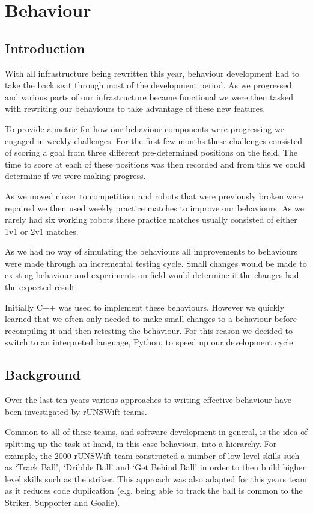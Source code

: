 \documentclass[pdftex,11pt,a4paper]{report}
\begin{document}
\newpage
\chapter{Behaviour}\label{sectionBehaviour}

\section{Introduction}
With all infrastructure being rewritten this year, behaviour development had to take the back seat through most of the development period. As we progressed and various parts of our infrastructure became functional we were then tasked with rewriting our behaviours to take advantage of these new features. 

To provide a metric for how our behaviour components were progressing we engaged in weekly challenges. For the first few months these challenges consisted of scoring a goal from three different pre-determined positions on the field. The time to score at each of these positions was then recorded and from this we could determine if we were making progress. 

As we moved closer to competition, and robots that were previously broken were repaired we then used weekly practice matches to improve our behaviours. As we rarely had six working robots these practice matches usually consisted of either 1v1 or 2v1 matches.

As we had no way of simulating the behaviours all improvements to behaviours were made through an incremental testing cycle. Small changes would be made to existing behaviour and experiments on field would determine if the changes had the expected result.

Initially C++ was used to implement these behaviours. However we quickly learned that we often only needed to make small changes to a behaviour before recompiling it and then retesting the behaviour. For this reason we decided to switch to an interpreted language, Python, to speed up our development cycle.

\section{Background} 
Over the last ten years various approaches to writing effective behaviour have been investigated by rUNSWift teams. 

Common to all of these teams, and software development in general, is the idea of splitting up the task at hand, in this case behaviour, into a hierarchy. For example, the 2000 rUNSWift team \cite{hengst00unswunited} constructed a number of low level skills such as `Track Ball', `Dribble Ball' and `Get Behind Ball' in order to then build higher level skills such as the striker. This approach was also adapted for this years team as it reduces code duplication (e.g. being able to track the ball is common to the Striker, Supporter and Goalie).
\end{document}
